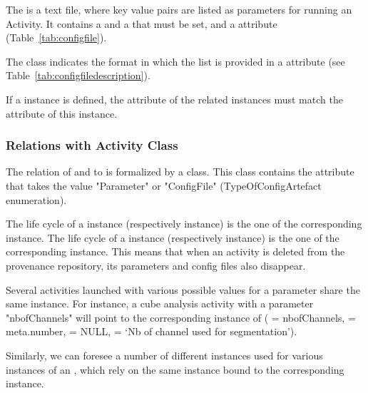 The  is a text file, where key value pairs are listed as parameters for running an Activity. It contains a  and a  that must be set, and a  attribute (Table~\ref{tab:configfile}).

The  class indicates the format in which the list is provided in a  attribute (see Table~\ref{tab:configfiledescription}).

If a  instance is defined, the  attribute of the related  instances must match the  attribute of this  instance.


\subsubsection{Relations with Activity Class}

The relation of  and  to  is formalized by a  class. This class contains the attribute  that takes the value "Parameter" or "ConfigFile" (TypeOfConfigArtefact enumeration).

The life cycle of a  instance (respectively  instance) is the one of the corresponding  instance.
The life cycle of a  instance (respectively  instance) is the one of the corresponding  instance.
This means that when an activity is deleted from the provenance repository, its parameters and config files also disappear.

Several activities launched with various possible values for a parameter share the same  instance.
For instance, a cube analysis activity with a parameter "nbofChannels" will point to the corresponding instance of  ( = nbofChannels,  = meta.number,  = NULL,  = ‘Nb of channel used for segmentation’).

Similarly, we can foresee a number of different  instances used for various instances of an , which rely on the same  instance bound to the corresponding  instance.

